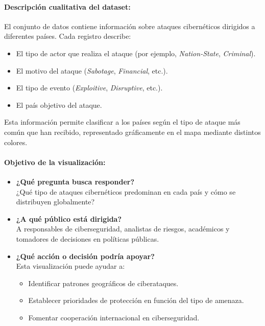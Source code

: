 \documentclass[12pt, a4paper]{article}
\begin{document}
\paragraph{Descripción cualitativa del dataset:}

El conjunto de datos contiene información sobre ataques cibernéticos dirigidos a diferentes países. Cada registro describe:
\begin{itemize}
    \item El tipo de actor que realiza el ataque (por ejemplo, \textit{Nation-State}, \textit{Criminal}).
    \item El motivo del ataque (\textit{Sabotage}, \textit{Financial}, etc.).
    \item El tipo de evento (\textit{Exploitive}, \textit{Disruptive}, etc.).
    \item El país objetivo del ataque.
\end{itemize}
Esta información permite clasificar a los países según el tipo de ataque más común que han recibido, representado gráficamente en el mapa mediante distintos colores.

\paragraph{Objetivo de la visualización:}

\begin{itemize}
    \item \textbf{¿Qué pregunta busca responder?} \\
    ¿Qué tipo de ataques cibernéticos predominan en cada país y cómo se distribuyen globalmente?

    \item \textbf{¿A qué público está dirigida?} \\
    A responsables de ciberseguridad, analistas de riesgos, académicos y tomadores de decisiones en políticas públicas.

    \item \textbf{¿Qué acción o decisión podría apoyar?} \\
    Esta visualización puede ayudar a:
    \begin{itemize}
        \item Identificar patrones geográficos de ciberataques.
        \item Establecer prioridades de protección en función del tipo de amenaza.
        \item Fomentar cooperación internacional en ciberseguridad.
    \end{itemize}
\end{itemize}
\end{document}
